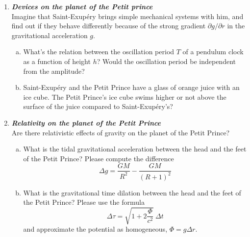\documentclass[a4paper,12pt]{article}
\newcommand{\question}[1]{\textbf{\textit{#1}}}
\begin{document}
\begin{enumerate}
\item \question{Devices on the planet of the Petit prince}\\
Imagine that Saint-Exup{\'e}ry brings simple mechanical systems with him, and find out if they behave differently because of the strong gradient $\partial g/\partial r$ in the gravitational acceleration $g$.
\begin{enumerate}[(a)]
\item{What's the relation between the oscillation period $T$ of a pendulum clock as a function of height $h$? Would the oscillation period be independent from the amplitude?}
\item{Saint-Exup{\'e}ry and the Petit Prince have a glass of orange juice
    with an ice cube. The Petit Prince's ice cube swims higher or not above the surface of the juice compared to Saint-Exup{\'e}ry's?}
\end{enumerate}

\item \question{Relativity on the planet of the Petit Prince}\\
Are there relativistic effects of gravity on the planet of the Petit Prince?
\begin{enumerate}[(a)]
\item{What is the tidal gravitational acceleration between the head
    and the feet of the Petit Prince? Please compute the difference
\begin{equation}
\Delta g = \frac{GM}{R^2}-\frac{GM}{(R+1)^2} 
\end{equation}
}
\item{What is the gravitational time dilation between the head and the feet of the Petit Prince? Please use the formula
\begin{equation}
\Delta \tau = \sqrt{1+2\frac{\Phi}{c^2}}\:\Delta t
\end{equation}
and approximate the potential as homogeneous, $\Phi = g\Delta r$.
}
\end{enumerate}
\end{enumerate}
\end{document}
